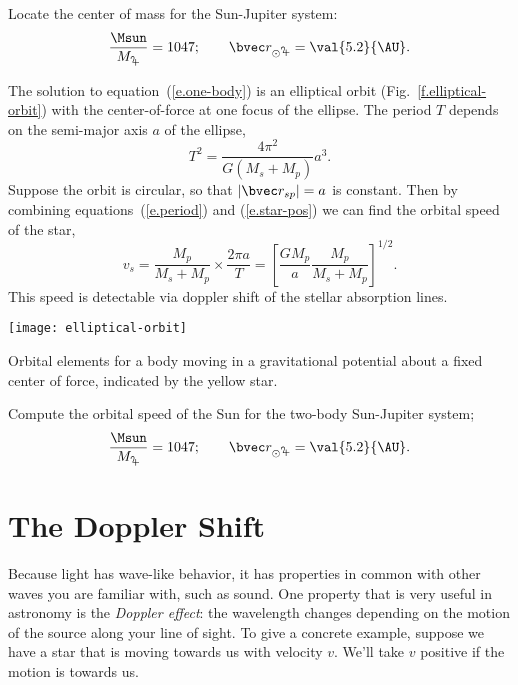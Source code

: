 \begin{exercisebox}
Locate the center of mass for the Sun-Jupiter system:
\[ \frac{\Msun}{M_{\mathrm{\jupiter}}} = 1047; \qquad \rv_{\mathrm{\odot\jupiter}} = \val{5.2}{\AU}. \]
\end{exercisebox}

The solution to equation~(\ref{e.one-body}) is an elliptical orbit (Fig.~\ref{f.elliptical-orbit}) with the center-of-force at one focus of the ellipse.  The period $T$ depends on the semi-major axis $a$ of the ellipse,
\begin{equation}\label{e.period}
	T^{2} = \frac{4\pi^{2}}{G(M_{s}+M_{p})} a^{3}.
\end{equation}
Suppose the orbit is circular, so that $|\rv_{sp}|=a$ is constant.  Then by combining equations~(\ref{e.period}) and (\ref{e.star-pos}) we can find the orbital speed of the star,
\begin{equation}\label{e.star-velocity}
	v_{s} = \frac{M_{p}}{M_{s}+M_{p}} \times \frac{2\pi a}{T} = \left[\frac{GM_{p}}{a}
	\frac{M_{p}}{M_{s}+M_{p}}\right]^{1/2}.
\end{equation}
This speed is detectable via doppler shift of the stellar absorption lines.

\begin{marginfigure}
\texttt{[image: elliptical-orbit]}
\caption[Orbital elements]{Orbital elements for a body moving in a gravitational potential about a fixed center of force, indicated by the yellow star.}
\label{f.elliptical-orbit}
\end{marginfigure}

\begin{exercisebox}
\label{ex.sun-orbital-speed}
	Compute the orbital speed of the Sun for the two-body Sun-Jupiter system;
\[ \frac{\Msun}{M_{\mathrm{\jupiter}}} = 1047; \qquad \rv_{\mathrm{\odot\jupiter}} = \val{5.2}{\AU}. \]
\end{exercisebox}

\section{The Doppler Shift}

Because light has wave-like behavior, it has properties in common with other waves you are familiar with, such as sound.  One property that is very useful in astronomy is the \emph{Doppler effect}: the wavelength changes depending on the motion of the source along your line of sight.  To give a concrete example, suppose we have a star that is moving towards us with velocity $v$.  We'll take $v$ positive if the motion is towards us.

